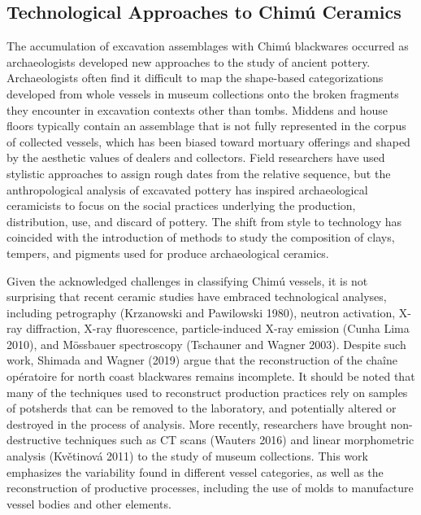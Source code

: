 \documentclass[]{interact}
\theoremstyle{plain}%
\theoremstyle{definition}
\theoremstyle{remark}
\begin{document}
\hypertarget{technological-approaches-to-chimuxfa-ceramics}{%
\subsection{Technological Approaches to Chimú
Ceramics}\label{technological-approaches-to-chimuxfa-ceramics}}

The accumulation of excavation assemblages with Chimú blackwares
occurred as archaeologists developed new approaches to the study of
ancient pottery. Archaeologists often find it difficult to map the
shape-based categorizations developed from whole vessels in museum
collections onto the broken fragments they encounter in excavation
contexts other than tombs. Middens and house floors typically contain an
assemblage that is not fully represented in the corpus of collected
vessels, which has been biased toward mortuary offerings and shaped by
the aesthetic values of dealers and collectors. Field researchers have
used stylistic approaches to assign rough dates from the relative
sequence, but the anthropological analysis of excavated pottery has
inspired archaeological ceramicists to focus on the social practices
underlying the production, distribution, use, and discard of pottery.
The shift from style to technology has coincided with the introduction
of methods to study the composition of clays, tempers, and pigments used
for produce archaeological ceramics.

Given the acknowledged challenges in classifying Chimú vessels, it is
not surprising that recent ceramic studies have embraced technological
analyses, including petrography (Krzanowski and Pawilowski 1980),
neutron activation, X-ray diffraction, X-ray fluorescence,
particle-induced X-ray emission (Cunha Lima 2010), and Mössbauer
spectroscopy (Tschauner and Wagner 2003). Despite such work, Shimada and
Wagner (2019) argue that the reconstruction of the chaîne opératoire for
north coast blackwares remains incomplete. It should be noted that many
of the techniques used to reconstruct production practices rely on
samples of potsherds that can be removed to the laboratory, and
potentially altered or destroyed in the process of analysis. More
recently, researchers have brought non-destructive techniques such as CT
scans (Wauters 2016) and linear morphometric analysis (Květinová 2011)
to the study of museum collections. This work emphasizes the variability
found in different vessel categories, as well as the reconstruction of
productive processes, including the use of molds to manufacture vessel
bodies and other elements.
\end{document}

